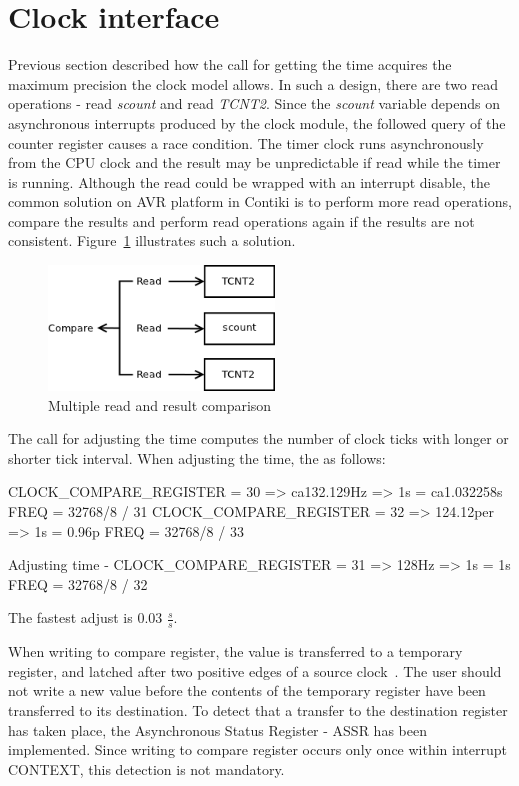
\section{Clock interface}\label{sec:design-clock}
Previous section described how the call for getting the time acquires
the maximum precision the clock model allows.
In such a design, there are two read operations - read {\it{scount}} and read {\it{TCNT2}}.
Since the {\it{scount}} variable depends on asynchronous interrupts produced by
the clock module, the followed query of the counter register causes a race condition.
The timer clock runs asynchronously from the CPU clock and
the result may be unpredictable if read while the timer is running.
Although the read could be wrapped with an interrupt disable,
the common solution on AVR platform in Contiki is to perform more read operations,
compare the results and perform read operations again if the results are not consistent.
Figure~\ref{fig:design-read} illustrates such a solution.

\begin{figure}
  \centering
  \includegraphics[width=6cm,keepaspectratio]{fig/read.png}
  \caption{Multiple read and result comparison}
  \label{fig:design-read}
\end{figure}

The call for adjusting the time computes the number of clock ticks
with longer or shorter tick interval.
When adjusting the time, the %
as follows:

CLOCK\_COMPARE\_REGISTER = 30 => ca132.129Hz => 1s = ca1.032258s
FREQ = 32768/8 / 31
CLOCK\_COMPARE\_REGISTER = 32 => 124.12per => 1s = 0.96p
FREQ = 32768/8 / 33

Adjusting time - CLOCK\_COMPARE\_REGISTER = 31 => 128Hz => 1s = 1s
FREQ = 32768/8 / 32

The fastest adjust is 0.03 $\frac{s}{s}$.

When writing to compare register, the value is transferred to a
temporary register, and latched after two positive edges of a source clock~\cite{avr-datasheet}.
The user should not write a new value before the contents
of the temporary register have been transferred to its destination.
To detect that a transfer to the destination register has taken place,
the Asynchronous Status Register - ASSR has been implemented.
Since writing to compare register occurs only once within interrupt CONTEXT, %
this detection is not mandatory.



